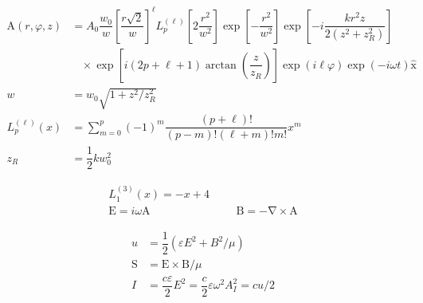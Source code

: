 \documentclass[xcolor=dvipsnames]{beamer}
\newcommand{\f}[2]{\dfrac{#1}{#2}} %
\newcommand{\p}[1]{\left(#1\right)} %
\renewcommand{\sp}[1]{\left[#1\right]} %
\renewcommand{\epsilon}{\varepsilon} %
\renewcommand{\phi}{\varphi} %
\renewcommand{\v}[1]{\boldsymbol{\mathrm{#1}}} %
\newcommand{\uv}[1]{\hat{\boldsymbol{\mathrm{#1}}}} %
\newcommand{\del}{\v\nabla} %
\begin{document}
\begin{frame}
  \centering
  \begin{align*}
    \v A\p{r,\phi,z}&=A_0\f{w_0}{w}\sp{\f{r\sqrt 2}{w}}^\ell
    L^{\p{\ell}}_p\sp{2\f{r^2}{w^2}}\exp\sp{-\f{r^2}{w^2}}
    \exp\sp{-i\f{kr^2z}{2\p{z^2+z_R^2}}} \\
    &~~~~\times\exp\sp{i\p{2p+\ell+1}\arctan\p{\f z{z_R}}}
    \exp\p{i\ell\phi}\exp\p{-i\omega t} \uv x\\
    w&=w_0\sqrt{1+z^2/z_R^2}\\
    L^{\p{\ell}}_p\p{x}
    & =\sum_{m=0}^p\p{-1}^m\f{\p{p+\ell}!}{\p{p-m}!\p{\ell+m}!m!}x^m\\
    z_R&=\f12 kw_0^2
  \end{align*}
\end{frame}

\begin{frame}
  \begin{align*}
    L^{\p{3}}_1\p{x}=-x+4\\
    \v E=i\omega\v A &&& \v B=-\del \times\v A
  \end{align*}
\end{frame}

\begin{frame}
  \begin{align*}
    u&=\f12\p{\epsilon E^2+B^2/\mu} \\
    \v S&=\v E\times\v B/\mu \\
    I&=\f{c\epsilon}2E^2=\f c2\epsilon\omega^2A_I^2=cu/2\\
  \end{align*}
\end{frame}
\end{document}
